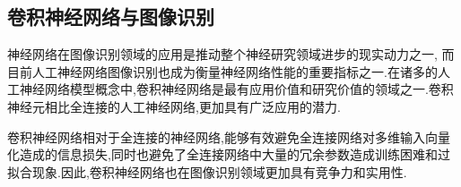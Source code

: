 \subsection{卷积神经网络与图像识别}

神经网络在图像识别领域的应用是推动整个神经研究领域进步的现实动力之一, 而目前人工神经网络图像识别也成为衡量神经网络性能的重要指标之一.在诸多的人工神经网络模型概念中,卷积神经网络是最有应用价值和研究价值的领域之一.卷积神经元相比全连接的人工神经网络,更加具有广泛应用的潜力.

卷积神经网络相对于全连接的神经网络,能够有效避免全连接网络对多维输入向量化造成的信息损失,同时也避免了全连接网络中大量的冗余参数造成训练困难和过拟合现象.因此,卷积神经网络也在图像识别领域更加具有竞争力和实用性.